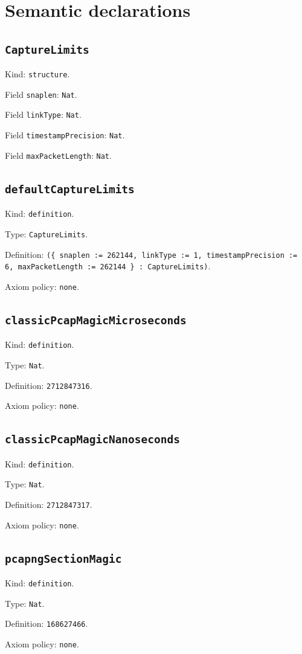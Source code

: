 \documentclass[11pt]{article}
\begin{document}
\section*{Semantic declarations}
\subsection*{\texttt{CaptureLimits}}
\noindent Kind: \texttt{structure}.\par
\noindent Field \texttt{snaplen}: \texttt{Nat}.\par
\noindent Field \texttt{linkType}: \texttt{Nat}.\par
\noindent Field \texttt{timestampPrecision}: \texttt{Nat}.\par
\noindent Field \texttt{maxPacketLength}: \texttt{Nat}.\par
\subsection*{\texttt{defaultCaptureLimits}}
\noindent Kind: \texttt{definition}.\par
\noindent Type: \texttt{CaptureLimits}.\par
\noindent Definition: \texttt{(\{ snaplen := 262144, linkType := 1, timestampPrecision := 6, maxPacketLength := 262144 \} : CaptureLimits)}.\par
\noindent Axiom policy: \texttt{none}.\par
\subsection*{\texttt{classicPcapMagicMicroseconds}}
\noindent Kind: \texttt{definition}.\par
\noindent Type: \texttt{Nat}.\par
\noindent Definition: \texttt{2712847316}.\par
\noindent Axiom policy: \texttt{none}.\par
\subsection*{\texttt{classicPcapMagicNanoseconds}}
\noindent Kind: \texttt{definition}.\par
\noindent Type: \texttt{Nat}.\par
\noindent Definition: \texttt{2712847317}.\par
\noindent Axiom policy: \texttt{none}.\par
\subsection*{\texttt{pcapngSectionMagic}}
\noindent Kind: \texttt{definition}.\par
\noindent Type: \texttt{Nat}.\par
\noindent Definition: \texttt{168627466}.\par
\noindent Axiom policy: \texttt{none}.\par
\end{document}
